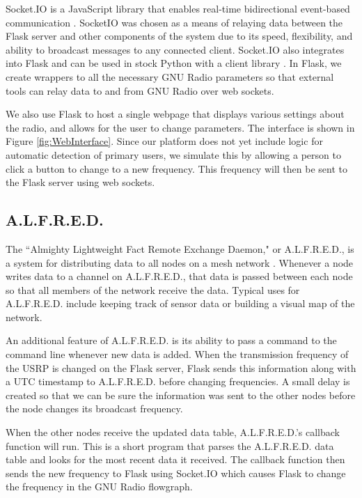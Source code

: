 Socket.IO is a JavaScript library that enables real-time bidirectional event-based communication \cite{0012}.  SocketIO was chosen as a means of relaying data between the Flask server and other components of the system due to its speed, flexibility, and ability to broadcast messages to any connected client. Socket.IO also integrates into Flask \cite{0013} and can be used in stock Python with a client library \cite{0014}. In Flask, we create wrappers to all the necessary GNU Radio parameters so that external tools can relay data to and from GNU Radio over web sockets.  

We also use Flask to host a single webpage that displays various settings about the radio, and allows for the user to change parameters. The interface is shown in Figure \ref{fig:WebInterface}. Since our platform does not yet include logic for automatic detection of primary users, we simulate this by allowing a person to click a button to change to a new frequency. This frequency will then be sent to the Flask server using web sockets.  

\subsection{A.L.F.R.E.D.}

 The ``Almighty Lightweight Fact Remote Exchange Daemon," or A.L.F.R.E.D., is a system for distributing data to all nodes on a mesh network \cite{0015}. Whenever a node writes data to a channel on A.L.F.R.E.D., that data is passed between each node so that all members of the network receive the data. Typical uses for A.L.F.R.E.D. include keeping track of sensor data or building a visual map of the network. 

 An additional feature of A.L.F.R.E.D. is its ability to pass a command to the command line whenever new data is added. When the transmission frequency of the USRP is changed on the Flask server, Flask sends this information along with a UTC timestamp to A.L.F.R.E.D. before changing frequencies. A small delay is created so that we can be sure the information was sent to the other nodes before the node changes its broadcast frequency.  

 When the other nodes receive the updated data table, A.L.F.R.E.D.'s callback function will run. This is a short program that parses the A.L.F.R.E.D. data table and looks for the most recent data it received. The callback function then sends the new frequency to Flask using Socket.IO which causes Flask to change the frequency in the GNU Radio flowgraph.   